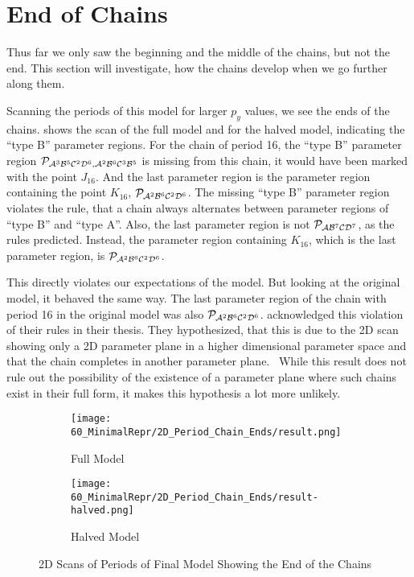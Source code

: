 \section{End of Chains}

Thus far we only saw the beginning and the middle of the chains, but not the end.
This section will investigate, how the chains develop when we go further along them.

Scanning the periods of this model for larger $p_y$ values, we see the ends of the chains.
 shows the scan of the full model and  for the halved model, indicating the ``type B'' parameter regions.
For the chain of period 16, the ``type B'' parameter region $\mathcal{P}_{\mathcal{A}^3\mathcal{B}^5\mathcal{C}^2\mathcal{D}^6, \mathcal{A}^2\mathcal{B}^6\mathcal{C}^3\mathcal{B}^5}$ is missing from this chain, it would have been marked with the point $J_{16}$.
And the last parameter region is the parameter region containing the point $K_{16}$, $\mathcal{P}_{\mathcal{A}^2\mathcal{B}^6\mathcal{C}^2\mathcal{D}^6}$.
The missing ``type B'' parameter region violates the rule, that a chain always alternates between parameter regions of ``type B'' and ``type A''.
Also, the last parameter region is not $\mathcal{P}_{\mathcal{A}\mathcal{B}^7\mathcal{C}\mathcal{D}^7}$, as the rules predicted.
Instead, the parameter region containing $K_{16}$, which is the last parameter region, is $\mathcal{P}_{\mathcal{A}^2\mathcal{B}^6\mathcal{C}^2\mathcal{D}^6}$.

This directly violates our expectations of the model.
But looking at the original model, it behaved the same way.
The last parameter region of the chain with period 16 in the original model was also $\mathcal{P}_{\mathcal{A}^2\mathcal{B}^6\mathcal{C}^2\mathcal{D}^6}$.
 acknowledged this violation of their rules in their thesis.
They hypothesized, that this is due to the 2D scan showing only a 2D parameter plane in a higher dimensional parameter space and that the chain completes in another parameter plane.~\Cite{akyuz2022}
While this result does not rule out the possibility of the existence of a parameter plane where such chains exist in their full form, it makes this hypothesis a lot more unlikely.

\begin{figure}
    \centering
    \begin{subfigure}{0.4\textwidth}
        \centering
        \texttt{[image: 60\_MinimalRepr/2D\_Period\_Chain\_Ends/result.png]}
        \caption{Full Model}
        \label{fig:final.period.end.full}
    \end{subfigure}
    \begin{subfigure}{0.4\textwidth}
        \centering
        \texttt{[image: 60\_MinimalRepr/2D\_Period\_Chain\_Ends/result-halved.png]}
        \caption{Halved Model}
        \label{fig:final.period.end.halved}
    \end{subfigure}
    \caption{2D Scans of Periods of Final Model Showing the End of the Chains}
\end{figure}

